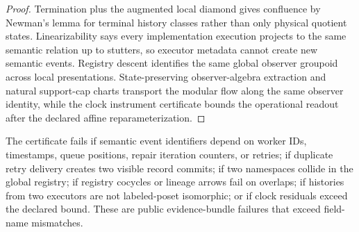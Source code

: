 \begin{proof}
Termination plus the augmented local diamond gives confluence by Newman's lemma for terminal
history classes rather than only physical quotient states. Linearizability says every
implementation execution projects to the same semantic relation up to stutters, so executor
metadata cannot create new semantic events. Registry descent identifies the same global observer
groupoid across local presentations. State-preserving observer-algebra extraction and natural
support-cap charts transport the modular flow along the same observer identity, while the clock
instrument certificate bounds the operational readout after the declared affine reparameterization.
\end{proof}

\begin{remark}[Falsifiers]\label{rem:observer-clock-falsifiers}
The certificate fails if semantic event identifiers depend on worker IDs, timestamps, queue
positions, repair iteration counters, or retries; if duplicate retry delivery creates two visible
record commits; if two namespaces collide in the global registry; if registry cocycles or lineage
arrows fail on overlaps; if histories from two executors are not labeled-poset isomorphic; or if
clock residuals exceed the declared bound. These are public evidence-bundle failures that exceed
field-name mismatches.
\end{remark}
